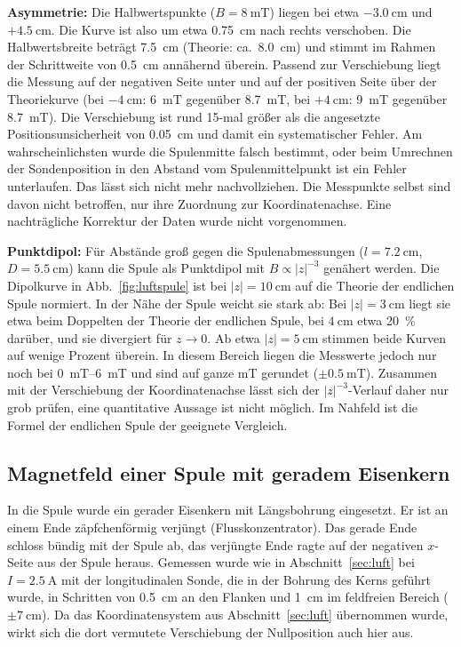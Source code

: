 \documentclass[a4paper,11pt]{article}
\begin{document}
\textbf{Asymmetrie:} Die Halbwertspunkte ($B=\SI{8}{\milli\tesla}$) liegen bei
etwa $-\SI{3.0}{\centi\meter}$ und $+\SI{4.5}{\centi\meter}$. Die Kurve ist also
um etwa \SI{0.75}{\centi\meter} nach rechts verschoben. Die Halbwertsbreite
beträgt \SI{7.5}{\centi\meter} (Theorie: ca.\ \SI{8.0}{\centi\meter}) und stimmt
im Rahmen der Schrittweite von \SI{0.5}{\centi\meter} annähernd überein. Passend
zur Verschiebung liegt die Messung auf der negativen Seite unter und auf der
positiven Seite über der Theoriekurve (bei $-\SI{4}{\centi\meter}$:
\SI{6}{\milli\tesla} gegenüber \SI{8.7}{\milli\tesla}, bei
$+\SI{4}{\centi\meter}$: \SI{9}{\milli\tesla} gegenüber \SI{8.7}{\milli\tesla}).
Die Verschiebung ist rund 15-mal größer als die angesetzte
Positionsunsicherheit von \SI{0.05}{\centi\meter} und damit ein systematischer
Fehler. Am wahrscheinlichsten wurde die Spulenmitte falsch bestimmt, oder beim
Umrechnen der Sondenposition in den Abstand vom Spulenmittelpunkt ist ein Fehler
unterlaufen. Das lässt sich nicht mehr nachvollziehen. Die Messpunkte selbst sind
davon nicht betroffen, nur ihre Zuordnung zur Koordinatenachse. Eine nachträgliche
Korrektur der Daten wurde nicht vorgenommen.

\textbf{Punktdipol:} Für Abstände groß gegen die Spulenabmessungen
($l=\SI{7.2}{\centi\meter}$, $D=\SI{5.5}{\centi\meter}$) kann die Spule als
Punktdipol mit $B\propto|z|^{-3}$ genähert werden. Die Dipolkurve in
Abb.~\ref{fig:luftspule} ist bei $|z|=\SI{10}{\centi\meter}$ auf die Theorie der
endlichen Spule normiert. In der Nähe der Spule weicht sie stark ab: Bei
$|z|=\SI{3}{\centi\meter}$ liegt sie etwa beim Doppelten der Theorie der
endlichen Spule, bei $\SI{4}{\centi\meter}$ etwa \SI{20}{\percent} darüber, und
sie divergiert für $z\to0$. Ab etwa $|z|=\SI{5}{\centi\meter}$ stimmen beide
Kurven auf wenige Prozent überein. In diesem Bereich liegen die Messwerte
jedoch nur noch bei \SIrange{0}{6}{\milli\tesla} und sind auf ganze
\si{\milli\tesla} gerundet ($\pm\SI{0.5}{\milli\tesla}$). Zusammen mit der
Verschiebung der Koordinatenachse lässt sich der $|z|^{-3}$-Verlauf daher nur
grob prüfen, eine quantitative Aussage ist nicht möglich. Im Nahfeld ist die
Formel der endlichen Spule der geeignete Vergleich.

\subsection{Magnetfeld einer Spule mit geradem Eisenkern}
\label{sec:eisen}
In die Spule wurde ein gerader Eisenkern mit Längsbohrung eingesetzt. Er ist an
einem Ende zäpfchenförmig verjüngt (Flusskonzentrator). Das gerade Ende schloss
bündig mit der Spule ab, das verjüngte Ende ragte auf der negativen
$x$-Seite aus der Spule heraus. Gemessen wurde wie in
Abschnitt~\ref{sec:luft} bei $I=\SI{2.5}{\ampere}$ mit der longitudinalen Sonde,
die in der Bohrung des Kerns geführt wurde, in Schritten von
\SI{0.5}{\centi\meter} an den Flanken und \SI{1}{\centi\meter} im feldfreien
Bereich ($\pm\SI{7}{\centi\meter}$). Da das Koordinatensystem aus
Abschnitt~\ref{sec:luft} übernommen wurde, wirkt sich die dort vermutete
Verschiebung der Nullposition auch hier aus.
\end{document}
